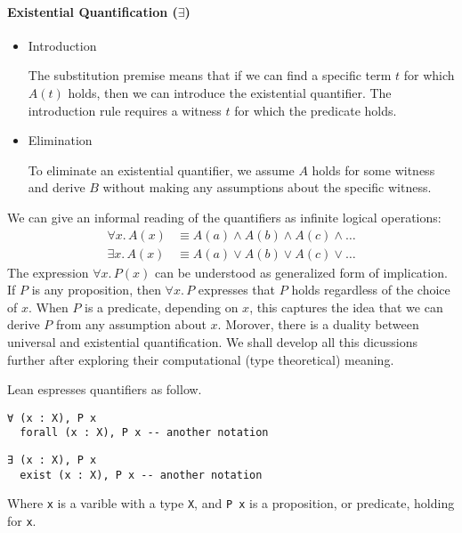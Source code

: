\paragraph{Existential Quantification ($\exists$)}
\begin{itemize}
    \item Introduction
    \begin{prooftree}
    \end{prooftree}
    The substitution premise means that if we can find a specific term $t$ for which $A(t)$ holds, 
    then we can introduce the existential quantifier. 
    The introduction rule requires a witness $t$ for which the predicate holds.
    \item Elimination
    \begin{prooftree}
    \end{prooftree}
    To eliminate an existential quantifier, we assume $A$ holds for some witness 
    and derive $B$ without making any assumptions about the specific witness.
\end{itemize}
We can give an informal reading of the quantifiers as infinite logical operations:
\begin{align*}
\forall x.\,A(x) &\equiv A(a) \land A(b) \land A(c) \land \ldots \\
\exists x.\,A(x) &\equiv A(a) \lor A(b) \lor A(c) \lor \ldots
\end{align*}
The expression $\forall x.\, P(x)$ can be understood as  generalized form of implication. 
If $P$ is any proposition, then $\forall x.\, P$ expresses that $P$ holds 
regardless of the choice of $x$. When $P$ is a predicate, depending on $x$, this captures the 
idea that we can derive $P$ from any assumption about $x$.
Morover, there is a duality between universal and existential quantification.
We shall develop all this dicussions further after 
exploring their computational (type theoretical) meaning.
\begin{example}
  Lean espresses quantifiers as follow.
  \begin{lstlisting}[language=Lean, caption=For All]
  ∀ (x : X), P x
  forall (x : X), P x -- another notation
  \end{lstlisting}
  \begin{lstlisting}[language=Lean, caption=Exists]
  ∃ (x : X), P x
  exist (x : X), P x -- another notation
  \end{lstlisting}
  Where \lstinline[language=lean]|x| is a varible with a type \lstinline[language=lean]|X|,
  and \lstinline[language=lean]|P x| is a proposition, or predicate, holding for \lstinline[language=lean]|x|.
\end{example}

